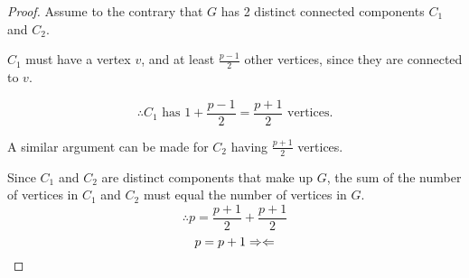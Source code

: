 \documentclass[12pt]{article}
\begin{document}
\begin{proof}
Assume to the contrary that $G$ has 2 distinct connected components $C_1$ and $C_2$.

$C_1$ must have a vertex $v$, and at least $\frac{p-1}{2}$ other vertices, since they are connected to $v$. 

$$\therefore C_1 \text{ has } 1 + \frac{p-1}{2} = \frac{p+1}{2} \text{ vertices.}$$

A similar argument can be made for $C_2$ having $\frac{p+1}{2}$ vertices.

Since $C_1$ and $C_2$ are distinct components that make up $G$, the sum of the number of vertices in $C_1$ and $C_2$ must equal the number of vertices in $G$.
$$\therefore p = \frac{p+1}{2} + \frac{p + 1}{2}$$
$$p = p + 1 \Rightarrow\Leftarrow$$

\end{proof}
\end{document}
